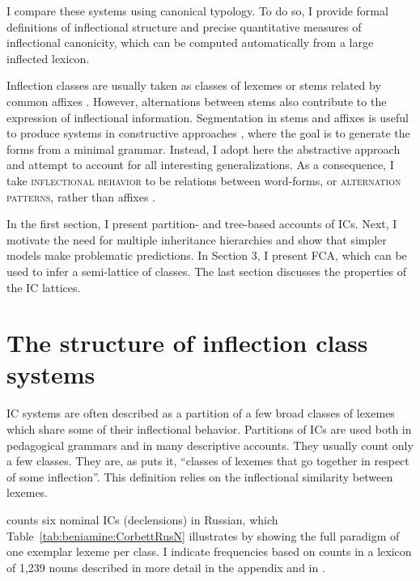 \documentclass[output=paper]{langscibook}
\begin{document}
    I compare these systems using canonical typology. To do so, I provide formal definitions of inflectional structure and precise quantitative measures of inflectional canonicity, which can be computed automatically from a large inflected lexicon. 
    
	    Inflection classes are usually taken as classes of lexemes or stems related by common affixes \citep{Carstairs1987,Carstairs-McCarthy1991,StumpFinkel2013}. However, alternations between stems also contribute to the expression of inflectional information. Segmentation in stems and affixes is useful to produce systems in constructive approaches \citep[in the sense of][]{Blevins2006}, where the goal is to generate the forms from a minimal grammar. Instead, I adopt here the abstractive approach \citep{Blevins2006} and attempt to account for all interesting generalizations. As a consequence, I take \textsc{inflectional behavior} to be relations between word-forms, or \textsc{alternation patterns}, rather than affixes \citep{BonamiLuis2014, BonamiBeniamine2016}.
    
    In the first section, I present partition- and tree-based accounts of ICs. Next, I motivate the need for multiple inheritance hierarchies and show that simpler models make problematic predictions. In Section 3, I present FCA, which can be used to infer a semi-lattice of classes. The last section discusses the properties of the IC lattices.
    
    \section{The structure of inflection class systems}
    \label{Section:beniamine:structure-of-IC-systems}
    
    IC systems are often described as a partition of a few broad classes of lexemes which share some of their inflectional behavior. Partitions of ICs are used both in pedagogical grammars and in many descriptive accounts. They usually count only a few classes. They are, as \citet[~129]{Matthews1991} puts it, ``classes of lexemes that go together in respect of some inflection''. This definition relies on the inflectional similarity between lexemes. 
    
    \citet{Corbett1982} counts six nominal ICs (declensions) in Russian, which Table~\ref{tab:beniamine:CorbettRusN} illustrates by showing the full paradigm of one exemplar lexeme per class. I indicate frequencies based on counts in a lexicon of 1,239 nouns \citep{BeniamineBrown2019} described in more detail in the appendix and in \cite{BeniaminePhd}.
    
\end{document}
